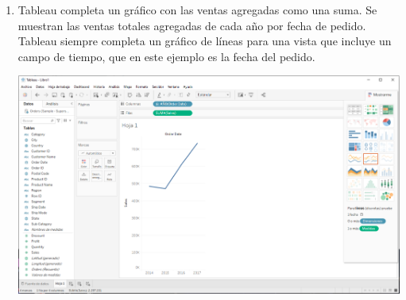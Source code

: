 \documentclass[12pt,letterpaper]{article}
\begin{document}
\begin{enumerate}
\begin{center}
        \end{center}
        \item Tableau completa un gráfico con las ventas agregadas como una suma. Se muestran las ventas totales agregadas de cada año por fecha de pedido. Tableau siempre completa un gráfico de líneas para una vista que incluye un campo de tiempo, que en este ejemplo es la fecha del pedido.
        \begin{center}
            \includegraphics[width=15cm]{./img/img11.png}
        \end{center}
    \end{enumerate}
\end{document}
